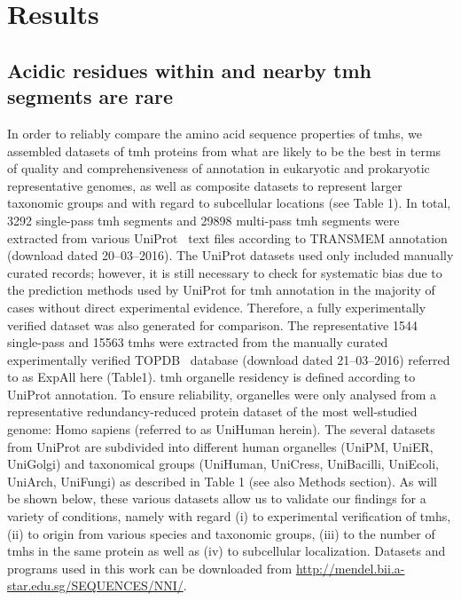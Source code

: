 \section{Results}

\subsection{Acidic residues within and nearby \gls{tmh} segments are rare}

In order to reliably compare the amino acid sequence properties of \gls{tmh}s, we assembled datasets of \gls{tmh} proteins from what are likely to be the best in terms of quality and comprehensiveness of annotation in eukaryotic and prokaryotic representative genomes, as well as composite datasets to represent larger taxonomic groups and with regard to subcellular locations (see Table 1). In total, 3292 single-pass \gls{tmh} segments and 29898 multi-pass \gls{tmh} segments were extracted from various UniProt~\cite{TheUniProtConsortium2014} text files according to TRANSMEM annotation (download dated 20--03--2016). The UniProt datasets used only included manually curated records; however, it is still necessary to check for systematic bias due to the prediction methods used by UniProt for \gls{tmh} annotation in the majority of cases without direct experimental evidence. Therefore, a fully experimentally verified dataset was also generated for comparison. The representative 1544 single-pass and 15563 \gls{tmh}s were extracted from the manually curated experimentally verified TOPDB~\cite{Dobson2015} database (download dated 21--03--2016) referred to as ExpAll here (Table1). \gls{tmh} organelle residency is defined according to UniProt annotation. To ensure reliability, organelles were only analysed from a representative redundancy-reduced protein dataset of the most well-studied genome: Homo sapiens (referred to as UniHuman herein). The several datasets from UniProt  are subdivided into different human organelles (UniPM, UniER, UniGolgi) and taxonomical groups (UniHuman, UniCress, UniBacilli, UniEcoli, UniArch, UniFungi) as described in Table 1 (see also Methods section). As will be shown below, these various datasets allow us to validate our findings for a variety of conditions, namely with regard (i) to experimental verification of \gls{tmh}s, (ii) to origin from various species and taxonomic groups, (iii) to the number of \gls{tmh}s in the same protein as well as (iv) to subcellular localization. Datasets and programs used in this work can be downloaded from \url{http://mendel.bii.a-star.edu.sg/SEQUENCES/NNI/}.


